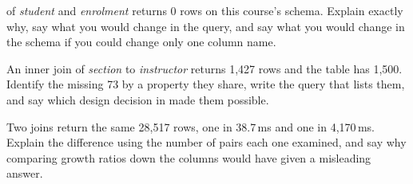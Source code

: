 \begin{checkpoint}
\begin{tightnum}
  \item {} of \textit{student} and \textit{enrolment}
        returns 0 rows on this course's schema. Explain exactly why, say what
        you would change in the query, and say what you would change in the
        schema if you could change only one column name.
  \item An inner join of \textit{section} to \textit{instructor} returns 1{,}427
        rows and the table has 1{,}500. Identify the missing 73 by a property
        they share, write the query that lists them, and say which design
        decision in  made them possible.
  \item Two joins return the same 28{,}517 rows, one in 38.7\,ms and one in
        4{,}170\,ms. Explain the difference using the number of pairs each one
        examined, and say why comparing growth ratios down the columns would
        have given a misleading answer.
\end{tightnum}
\end{checkpoint}

